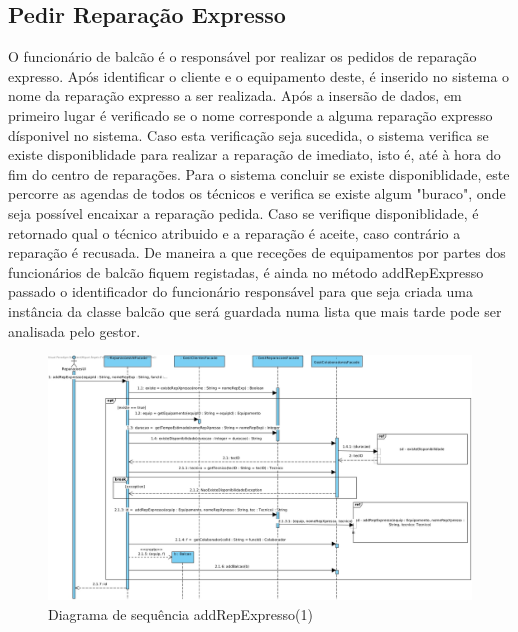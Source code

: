 \documentclass[../relatorio.tex]{subfiles}
\begin{document}
\subsection{Pedir Reparação Expresso}

O funcionário de balcão é o responsável por realizar os pedidos de reparação expresso. Após identificar o cliente e o equipamento deste, é inserido
no sistema o nome da reparação expresso a ser realizada.
Após a insersão de dados, em primeiro lugar é verificado se o nome corresponde a alguma reparação expresso dísponivel no sistema. Caso esta verificação
seja sucedida, o sistema verifica se existe disponiblidade para realizar a reparação de imediato, isto é, até à hora do fim do centro de reparações.
Para o sistema concluir se existe disponiblidade, este percorre as agendas de todos os técnicos e verifica se existe algum "buraco", onde seja
possível encaixar a reparação pedida. Caso se verifique disponiblidade, é retornado qual o técnico atribuido e a reparação é aceite, caso contrário a
reparação é recusada.
De maneira a que receções de equipamentos por partes dos funcionários de balcão fiquem registadas, é ainda no método addRepExpresso passado o identificador
do funcionário responsável para que seja criada uma instância da classe balcão que será guardada numa lista que mais tarde pode ser analisada pelo gestor.

\begin{figure}[!ht]
    \centering
    \includegraphics[scale=0.45]{../assets/diagramas_sequencia/sd-addRepExpresso.jpg}
    \caption{Diagrama de sequência addRepExpresso(1)}
\end{figure}
\end{document}
